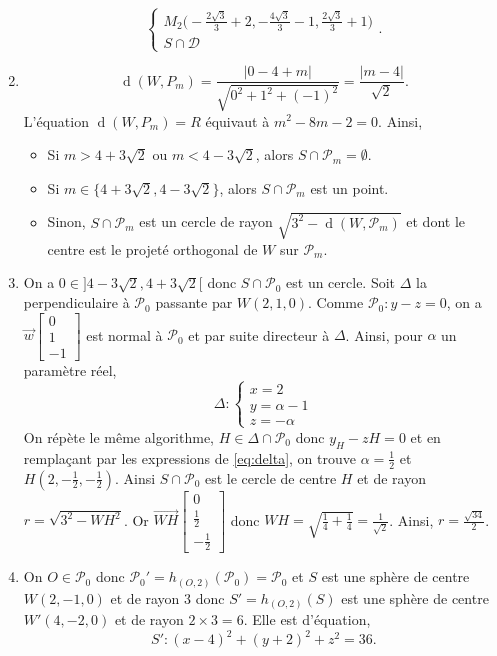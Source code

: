 \documentclass{article}
\DeclareMathOperator{\distan}{d}
\begin{document}
\begin{enumerate}
\[\begin{cases}
			 M_2\Big(-\frac{2\sqrt{3}}{3}+2,-\frac{4\sqrt{3}}{3}-1,\frac{2\sqrt{3}}{3}+1\Big)\\
			 S\cap\mathcal{D}
		 \end{cases}.
	\] 
\item $$\distan(W,P_m)=\frac{\Big|0-4+m|}{\sqrt{0^2+1^2+(-1)^2}}=\frac{\big|m-4\big|}{\sqrt{2}}.$$
	L'équation  $\distan(W,P_m)=R$ équivaut à  $m^2-8m-2=0$. Ainsi,
	\begin{itemize}
		\item Si $m>4+3\sqrt{2}$ ou $m<4-3\sqrt{2}$, alors  $S\cap \mathcal{P}_m=\emptyset$.
		\item Si $m\in\Big\{4+3\sqrt{2}, 4-3\sqrt{2}\Big\}$, alors $S\cap \mathcal{P}_m$ est un point.
	\item Sinon, $S\cap \mathcal{P}_m$ est un cercle de rayon $\sqrt{3^2-\distan(W,\mathcal{P}_m)}$ et dont le centre est le projeté orthogonal de $W$ sur $\mathcal{P}_m$. 
\end{itemize}
	\item On a $0\in]4-3\sqrt{2},4+3\sqrt{2}[$ donc $S\cap\mathcal{P}_0$ est un cercle. Soit  $\Delta$ la perpendiculaire à  $\mathcal{P}_0$ passante par $W(2,1,0)$. Comme $\mathcal{P}_0:y-z=0$, on a $\vec{w}\begin{bmatrix}0\\1\\-1\end{bmatrix}$ est normal à $\mathcal{P}_0$ et par suite directeur à $\Delta$. Ainsi, pour  $\alpha$ un paramètre réel,
		\begin{equation}
			\Delta:\begin{cases}
				x=2\\
				y=\alpha-1\\
				z=-\alpha
			\end{cases}\label{eq:delta}
		\end{equation}
		On répète le même algorithme, $H\in\Delta\cap\mathcal{P}_0$ donc  $y_H-zH=0$ et en remplaçant par les expressions de \eqref{eq:delta}, on trouve  $\alpha=\frac{1}{2}$ et $H(2,-\frac{1}{2},-\frac{1}{2})$.
		Ainsi $S\cap\mathcal{P}_0$ est le cercle de centre $H$ et de rayon $r=\sqrt{3^2-WH^2}$. Or $\overrightarrow{WH}\begin{bmatrix}0\\\frac{1}{2}\\-\frac{1}{2}\end{bmatrix}$ donc $WH=\sqrt{\frac{1}{4}+\frac{1}{4}}=\frac{1}{\sqrt{2}}$. Ainsi, $r=\frac{\sqrt{34}}{2}$.
	\item On $O\in\mathcal{P}_0$ donc $\mathcal{P}_0'=h_{(O,2)}(\mathcal{P}_0)=\mathcal{P}_0$ et  $S$ est une sphère de centre  $W(2,-1,0)$ et de rayon $3$ donc  $S'=h_{(O,2)}(S)$ est une sphère de centre $W'(4,-2,0)$ et de rayon $2\times3=6$. Elle est d'équation, \[
			S':(x-4)^2+(y+2)^2+z^2=36
	.\] 
\end{enumerate}
\end{document}
